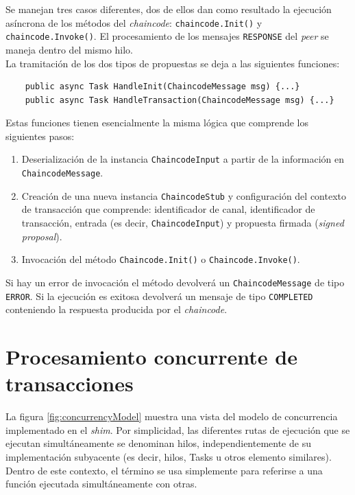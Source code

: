 Se manejan tres casos diferentes, dos de ellos dan como resultado la ejecución asíncrona de los métodos del \textit{chaincode}: \texttt{chaincode.Init()} y \texttt{chaincode.Invoke()}. El procesamiento de los mensajes \texttt{RESPONSE} del \textit{peer} se maneja dentro del mismo hilo.\\

La tramitación de los dos tipos de propuestas se deja a las siguientes funciones:\\

\begin{lstlisting}
	public async Task HandleInit(ChaincodeMessage msg) {...}
	public async Task HandleTransaction(ChaincodeMessage msg) {...}
\end{lstlisting}

Estas funciones tienen esencialmente la misma lógica que comprende los siguientes pasos:

\begin{enumerate}
\item Deserialización de la instancia \texttt{ChaincodeInput} a partir de la información en \texttt{ChaincodeMessage}.

\item Creación de una nueva instancia \texttt{ChaincodeStub} y configuración del contexto de transacción que comprende: identificador de canal, identificador de transacción, entrada (es decir, \texttt{ChaincodeInput}) y propuesta firmada (\textit{signed proposal}).

\item Invocación del método \texttt{Chaincode.Init()} o \texttt{Chaincode.Invoke()}.
\end{enumerate}

Si hay un error de invocación el método devolverá un \texttt{ChaincodeMessage} de tipo \texttt{ERROR}. Si la ejecución es exitosa devolverá un mensaje de tipo \texttt{COMPLETED} conteniendo la respuesta producida por el \textit{chaincode}.



\section{Procesamiento concurrente de transacciones}\label{concurrencymodel}
La figura \ref{fig:concurrencyModel} muestra una vista del modelo de concurrencia implementado en el \textit{shim}. Por simplicidad, las diferentes rutas de ejecución que se ejecutan simultáneamente se denominan hilos, independientemente de su implementación subyacente (es decir, hilos, Tasks u otros elemento similares). Dentro de este contexto, el término se usa simplemente para referirse a una función ejecutada simultáneamente con otras.

